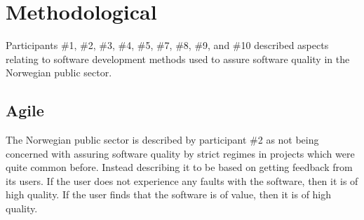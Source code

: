 

\section{Methodological} \label{sec:methodological}
Participants \#1, \#2, \#3, \#4, \#5, \#7, \#8, \#9, and \#10 described aspects relating to software development methods used to assure software quality in the Norwegian public sector.

\subsection{Agile} \label{sec:agile}
The Norwegian public sector is described by participant \#2 as not being concerned with assuring software quality by strict regimes in projects which were quite common before. Instead describing it to be based on getting feedback from its users. If the user does not experience any faults with the software, then it is of high quality. If the user finds that the software is of value, then it is of high quality.


